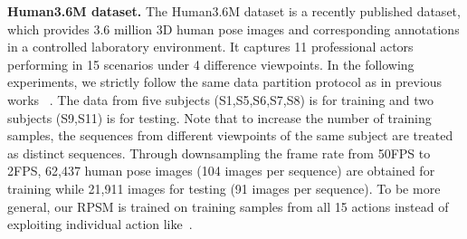 \documentclass[10pt,twocolumn,letterpaper]{article}
\begin{document}
\textbf{Human3.6M dataset.} The Human3.6M dataset is a recently published dataset, which provides 3.6 million 3D human pose images and corresponding annotations in a controlled laboratory environment. It captures 11 professional actors performing in 15 scenarios under 4 difference viewpoints. In the following experiments, we strictly follow the same data partition protocol as in previous works
~\cite{zhou2015sparseness,li2015maximum,zhou2016deep,Tekin_2016_CVPR,DBLP:conf/eccv/DuWLHGWKG16,DBLP:conf/eccv/SanzariNP16}. The data from five subjects (S1,S5,S6,S7,S8) is for training and two subjects (S9,S11) is for testing. Note that to increase the number of training samples, the sequences from different viewpoints of the same subject are treated as distinct sequences. 
Through downsampling the frame rate from 50FPS to 2FPS, 62,437 human pose images (104 images per sequence) are obtained for training while 21,911 images for testing (91 images per sequence). To be more general, our RPSM is trained on training samples from all 15 actions instead of exploiting individual action like~\cite{zhou2015sparseness,li2015maximum}.
\end{document}
